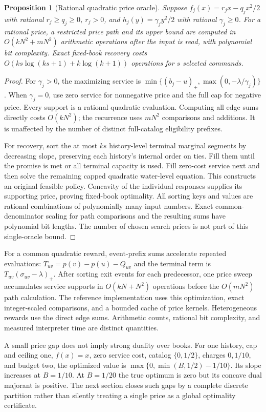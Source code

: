 \documentclass[11pt,letterpaper]{article}
\newtheorem{proposition}[theorem]{Proposition}
\theoremstyle{definition}\newtheorem{remark}[theorem]{Remark}
\begin{document}
\begin{proposition}[Rational quadratic price oracle]\label{prop:oracle54}
Suppose $f_j(x)=r_jx-q_jx^2/2$ with rational $r_j\geq q_j\geq0$, $r_j>0$, and $h_j(y)=\gamma_jy^2/2$ with rational $\gamma_j\geq0$. For a rational price, a restricted price path and its upper bound are computed in $O(kN^2+mN^2)$ arithmetic operations after the input is read, with polynomial bit complexity. Exact fixed-book recovery costs $O(ks\log(ks+1)+k\log(k+1))$ operations for $s$ selected commands.
\end{proposition}
\begin{proof}
For $\gamma_j>0$, the maximizing service is $\min\{(b_j-u)_+,\max(0,-\lambda/\gamma_j)\}$. When $\gamma_j=0$, use zero service for nonnegative price and the full cap for negative price. Every support is a rational quadratic evaluation. Computing all edge sums directly costs $O(kN^2)$; the recurrence uses $mN^2$ comparisons and additions. It is unaffected by the number of distinct full-catalog eligibility prefixes.

For recovery, sort the at most $ks$ history-level terminal marginal segments by decreasing slope, preserving each history's internal order on ties. Fill them until the promise is met or all terminal capacity is used. Fill zero-cost service next and then solve the remaining capped quadratic water-level equation. This constructs an original feasible policy. Concavity of the individual responses supplies its supporting price, proving fixed-book optimality. All sorting keys and values are rational combinations of polynomially many input numbers. Exact common-denominator scaling for path comparisons and the resulting sums have polynomial bit lengths. The number of chosen search prices is not part of this single-oracle bound.
\end{proof}

For a common quadratic reward, event-prefix sums accelerate repeated evaluations: $T_{uv}=p(v)-p(u)-Q_{uv}$ and the terminal term is $T_{uv}(\sigma_{uv}-\lambda)_+$. After sorting exit events for each predecessor, one price sweep accumulates service supports in $O(kN+N^2)$ operations before the $O(mN^2)$ path calculation. The reference implementation uses this optimization, exact integer-scaled comparisons, and a bounded cache of price kernels. Heterogeneous rewards use the direct edge sums. Arithmetic counts, rational bit complexity, and measured interpreter time are distinct quantities.

A small price gap does not imply strong duality over books. For one history, cap and ceiling one, $f(x)=x$, zero service cost, catalog $\{0,1/2\}$, charges $0,1/10$, and budget two, the optimized value is $\max\{0,\min(B,1/2)-1/10\}$. Its slope increases at $B=1/10$. At $B=1/20$ the true optimum is zero but its concave dual majorant is positive. The next section closes such gaps by a complete discrete partition rather than silently treating a single price as a global optimality certificate.
\end{document}
